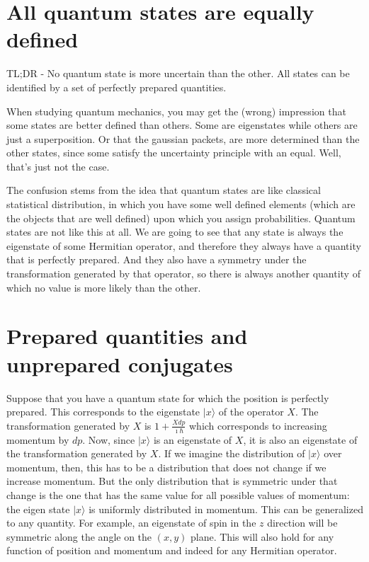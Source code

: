 \documentclass[aps,pra,10pt,floatfix,nofootinbib]{revtex4-1}
\theoremstyle{definition}
\begin{document}
\section{All quantum states are equally defined}
TL;DR - No quantum state is more uncertain than the other. All states can be identified by a set of perfectly prepared quantities.

When studying quantum mechanics, you may get the (wrong) impression that some states are better defined than others. Some are eigenstates while others are just a superposition. Or that the gaussian packets, are more determined than the other states, since some satisfy the uncertainty principle with an equal. Well, that's just not the case.

The confusion stems from the idea that quantum states are like classical statistical distribution, in which you have some well defined elements (which are the objects that are well defined) upon which you assign probabilities. Quantum states are not like this at all. We are going to see that any state is always the eigenstate of some Hermitian operator, and therefore they always have a quantity that is perfectly prepared. And they also have a symmetry under the transformation generated by that operator, so there is always another quantity of which no value is more likely than the other.

\section{Prepared quantities and unprepared conjugates}

Suppose that you have a quantum state for which the position is perfectly prepared. This corresponds to the eigenstate $|x\rangle$ of the operator $X$. The transformation generated by $X$ is $1+\frac{Xdp}{\imath\hbar}$ which corresponds to increasing momentum by $dp$. Now, since $|x\rangle$ is an eigenstate of $X$, it is also an eigenstate of the transformation generated by $X$. If we imagine the distribution of $|x\rangle$ over momentum, then, this has to be a distribution that does not change if we increase momentum. But the only distribution that is symmetric under that change is the one that has the same value for all possible values of momentum: the eigen state $|x\rangle$ is uniformly distributed in momentum. This can be generalized to any quantity. For example, an eigenstate of spin in the $z$ direction will be symmetric along the angle on the $(x,y)$ plane. This will also hold for any function of position and momentum and indeed for any Hermitian operator.
\end{document}
